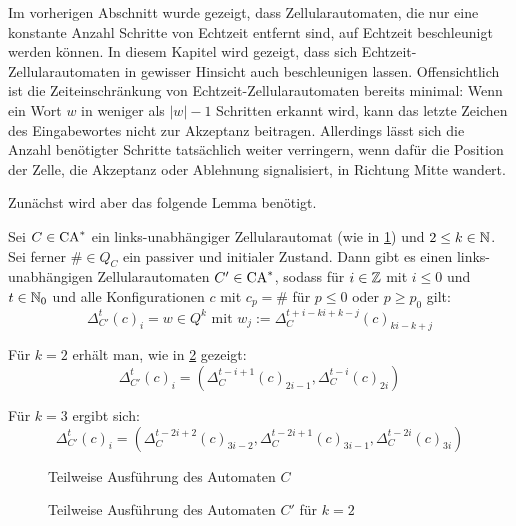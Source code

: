 Im vorherigen Abschnitt wurde gezeigt, dass Zellularautomaten,
die nur eine konstante Anzahl Schritte von Echtzeit entfernt sind,
auf Echtzeit beschleunigt werden können.
In diesem Kapitel wird gezeigt, dass sich Echtzeit-Zellularautomaten in gewisser Hinsicht auch beschleunigen lassen.
Offensichtlich ist die Zeiteinschränkung von Echtzeit-Zellularautomaten bereits minimal:
Wenn ein Wort $w$ in weniger als $|w|-1$ Schritten erkannt wird, kann das letzte Zeichen des Eingabewortes nicht zur Akzeptanz beitragen.
Allerdings lässt sich die Anzahl benötigter Schritte tatsächlich weiter verringern,
wenn dafür die Position der Zelle, die Akzeptanz oder Ablehnung signalisiert, in Richtung Mitte wandert.

Zunächst wird aber das folgende Lemma benötigt.

\begin{lemma}
    \label{linksunabhaengigSpeedup}
    Sei $C \in \textrm{CA}^*$ ein links-unabhängiger Zellularautomat (wie in \cref{fig:LinUnabhSpeedup1}) und $2 \leq k \in \mathbb{N}$.
    Sei ferner $\# \in Q_C$ ein passiver und initialer Zustand.
    Dann gibt es einen links-unabhängigen Zellularautomaten
    $C' \in \textrm{CA}^*$, sodass für $i \in \mathbb{Z}$ mit $i \leq 0$ und $t \in \mathbb{N}_0$
    und alle Konfigurationen $c$ mit $c_p = \#$ für $p \leq 0$ oder $p \geq p_0$ gilt:
    \[
        \Delta^{t}_{C'}(c)_i =
            w \in Q^k
            \text{ mit } w_j := \Delta^{ t + i - ki+k-j }_C(c)_{ ki-k+j }
    \]
    
    Für $k = 2$ erhält man, wie in \cref{fig:LinUnabhSpeedup2} gezeigt:
    \[
        \Delta^{t}_{C'}(c)_i = ( \Delta^{ t - i+1 }_C(c)_{ 2i-1 },
            \Delta^{ t - i }_C(c)_{ 2i })
    \]

    Für $k = 3$ ergibt sich:
    \[
        \Delta^{t}_{C'}(c)_i = ( \Delta^{t-2i+2}_C(c)_{3i-2},
        \Delta^{t-2i+1}_C(c)_{3i-1},
        \Delta^{t-2i}_C(c)_{3i}
        )
    \]
    
    \begin{figure}[!ht]
        \centering
        
        \caption{Teilweise Ausführung des Automaten $C$}
        \label{fig:LinUnabhSpeedup1}
    \end{figure}
    \begin{figure}[!ht]
        \centering
        
        \caption{Teilweise Ausführung des Automaten $C'$ für $k = 2$}
        \label{fig:LinUnabhSpeedup2}
    \end{figure}
    
\end{lemma}
